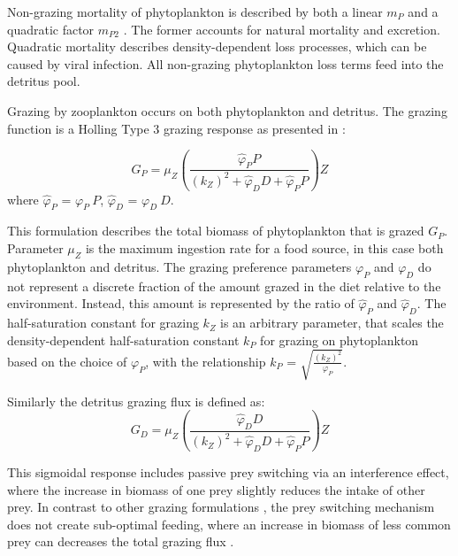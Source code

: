 \documentclass[journal abbreviation, manuscript]{copernicus}
\begin{document}
Non-grazing mortality of phytoplankton is described by both a linear $m_P$ and a quadratic factor $m_{P2}$ \citep{Yool2011Medusa-1.0:Domain}. The former accounts for natural mortality and excretion. Quadratic mortality describes density-dependent loss processes, which can be caused by viral infection. All non-grazing phytoplankton loss terms feed into the detritus pool.

Grazing by zooplankton occurs on both phytoplankton and detritus. The grazing function is a Holling Type 3 grazing response as presented in \citet{Anderson2015c}:

\begin{equation}
    G_P = \mu_Z \left( \frac{ \hat{\varphi}_P P}{(k_Z)^2 + \hat{\varphi}_D D +\hat{\varphi}_P P}  \right) Z
\end{equation}
where $\hat{\varphi}_P$ = $\varphi_P \ P$, $\hat{\varphi}_D$ = $\varphi_D \ D$.

This formulation describes the total biomass of phytoplankton that is grazed $G_P$. Parameter $\mu_Z$ is the maximum ingestion rate for a food source, in this case both phytoplankton and detritus. 
The grazing preference parameters $\varphi_P$ and $\varphi_D$ do not represent a discrete fraction of the amount grazed in the diet relative to the environment. Instead, this amount is represented by the ratio of $\hat{\varphi}_P$ and $\hat{\varphi}_D$. 
The half-saturation constant for grazing $k_Z$ is an arbitrary parameter, that scales the density-dependent half-saturation constant $k_P$ for grazing on phytoplankton based on the choice of $\varphi_P$, with the relationship $k_P$ = $\sqrt{\frac{(k_Z)^2 }{\varphi_P}}$.

Similarly the detritus grazing flux is defined as:
\begin{equation}
    G_D = \mu_Z \left( \frac{ \hat{\varphi}_D D}{(k_Z)^2 + \hat{\varphi}_D D +\hat{\varphi}_P P}  \right) Z
\end{equation}

This sigmoidal response includes passive prey switching via an interference effect, where the increase in biomass of one prey slightly reduces the intake of other prey. In contrast to other grazing formulations \citep[e.g.,][]{Fasham1990a}, the prey switching mechanism does not create sub-optimal feeding, where an increase in biomass of less common prey can decreases the total grazing flux \citep{Gentleman2003a}.
\end{document}
